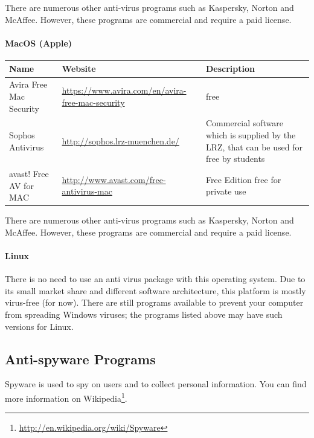 \documentclass[a4paper,12pt]{scrartcl}
\begin{document}
There are numerous other anti-virus programs such as Kaspersky, Norton and McAffee. However, these programs are commercial and require a paid license.

\paragraph*{MacOS (Apple)}
\begin{center}
  \begin{tabularx}{\linewidth}{|p{.2\linewidth}XX|}
    \hline
    Name & Website & Description\\
    \hline \hline
    Avira Free Mac Security & \url{https://www.avira.com/en/avira-free-mac-security} & free\\
    \hline
    Sophos Antivirus & \url{http://sophos.lrz-muenchen.de/} & Commercial software which is supplied by the LRZ, that can be used for free by students\\
    \hline
    avast! Free AV for MAC & \url{http://www.avast.com/free-antivirus-mac} & Free Edition free for private use\\
    \hline
  \end{tabularx}
\end{center}

There are numerous other anti-virus programs such as Kaspersky, Norton and McAffee. However, these programs are commercial and require a paid license.

\paragraph*{Linux}

There is no need to use an anti virus package with this operating system. Due to its small market share and different software architecture, this platform is mostly virus-free (for now). There are still programs available to prevent your computer from spreading Windows viruses; the programs listed above may have such versions for Linux.

\pagebreak

\subsection*{Anti-spyware Programs}

Spyware is used to spy on users and to collect personal information. You can find more information on Wikipedia\footnote{\url{http://en.wikipedia.org/wiki/Spyware}}.
\end{document}
